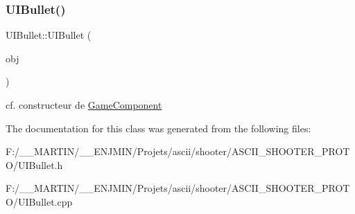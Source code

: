 \subsubsection{\texorpdfstring{U\+I\+Bullet()}{UIBullet()}}
{\footnotesize\ttfamily U\+I\+Bullet\+::\+U\+I\+Bullet (\begin{DoxyParamCaption}\item[{\hyperlink{class_game_object}{Game\+Object} $\ast$}]{obj }\end{DoxyParamCaption})}

cf. constructeur de \hyperlink{class_game_component}{Game\+Component} 

The documentation for this class was generated from the following files\+:\begin{DoxyCompactItemize}
\item 
F\+:/\+\_\+\+\_\+\+M\+A\+R\+T\+I\+N/\+\_\+\+\_\+\+E\+N\+J\+M\+I\+N/\+Projets/ascii/shooter/\+A\+S\+C\+I\+I\+\_\+\+S\+H\+O\+O\+T\+E\+R\+\_\+\+P\+R\+O\+T\+O/U\+I\+Bullet.\+h\item 
F\+:/\+\_\+\+\_\+\+M\+A\+R\+T\+I\+N/\+\_\+\+\_\+\+E\+N\+J\+M\+I\+N/\+Projets/ascii/shooter/\+A\+S\+C\+I\+I\+\_\+\+S\+H\+O\+O\+T\+E\+R\+\_\+\+P\+R\+O\+T\+O/U\+I\+Bullet.\+cpp\end{DoxyCompactItemize}
